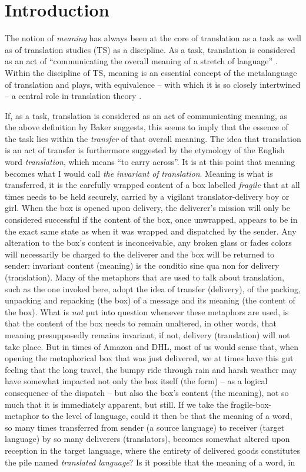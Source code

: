 \chapter{Introduction}
The notion of \textit{meaning} has always been at the core of translation as a task as well as of translation studies (TS) as a discipline. As a task, translation is considered as an act of “communicating the overall meaning of a stretch of language” \citep[10]{baker_other_1992}. Within the discipline of TS, meaning is an essential concept of the metalanguage of translation and plays, with equivalence – with which it is so closely intertwined – a central role in translation theory \citep{halverson_concept_1997}.

If, as a task, translation is considered as an act of communicating meaning, as the above definition by Baker suggests, this seems to imply that the essence of the task lies within the \textit{transfer} of that overall meaning. The idea that translation is an act of transfer is furthermore suggested by the etymology of the English word \textit{translation}, which means “to carry across”. It is at this point that meaning becomes what I would call \textit{the} \textit{invariant} \textit{of} \textit{translation}. Meaning is what is transferred, it is the carefully wrapped content of a box labelled \textit{fragile} that at all times needs to be held securely, carried by a vigilant translator-delivery boy or girl. When the box is opened upon delivery, the deliverer’s mission will only be considered successful if the content of the box, once unwrapped, appears to be in the exact same state as when it was wrapped and dispatched by the sender. Any alteration to the box’s content is inconceivable, any broken glass or fades colors will necessarily be charged to the deliverer and the box will be returned to sender: invariant content (meaning) is the conditio sine qua non for delivery (translation). Many of the metaphors that are used to talk about translation, such as the one invoked here, adopt the idea of transfer (delivery), of the packing, unpacking and repacking (the box) of a message and its meaning (the content of the box). What is \textit{not} put into question whenever these metaphors are used, is that the content of the box needs to remain unaltered, in other words, that meaning presupposedly remains invariant, if not, delivery (translation) will not take place. But in times of Amazon and DHL, most of us would sense that, when opening the metaphorical box that was just delivered, we at times have this gut feeling that the long travel, the bumpy ride through rain and harsh weather may have somewhat impacted not only the box itself (the form) – as a logical consequence of the dispatch – but also the box’s content (the meaning), not so much that it is immediately apparent, but still. If we take the fragile-box-metaphor to the level of language, could it then be that the meaning of a word, so many times transferred from sender (a source language) to receiver (target language) by so many deliverers (translators), becomes somewhat altered upon reception in the target language, where the entirety of delivered goods constitutes the pile named \textit{translated} \textit{language}? Is it possible that the meaning of a word, in 